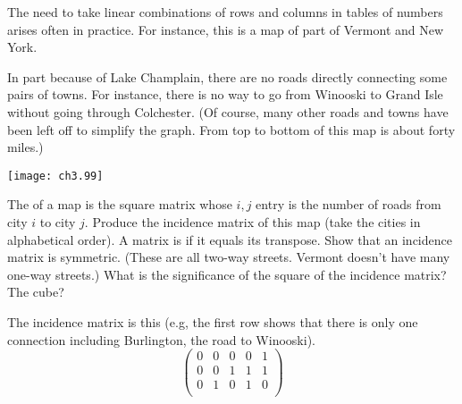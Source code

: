 \begin{exercises}
\begin{answer}
\begin{exparts}
      \end{exparts}   
    \end{answer}
  \recommended \item 
    The need to take linear combinations of rows and columns in tables of 
    numbers arises often in practice.
    For instance, this is a map of part of Vermont and New York.
    \begin{center}
      \parbox{2in}{In part because of Lake Champlain, there are
                      no roads directly connecting some pairs of towns.
                      For instance, there is no way to go from
                      Winooski to Grand Isle without going through
                      Colchester.
                      (Of course, many other roads and towns
                      have been left off to simplify the graph.
                      From top to bottom of this map is
                      about forty miles.)}
      \quad
      \parbox{2in}{\texttt{[image: ch3.99]}}
    \end{center}
    \begin{exparts}
      \partsitem The %
        of a map is the square matrix
        whose \( i,j \) entry is the number of roads from city \( i \)
        to city \( j \).
        Produce the incidence matrix of this map (take the cities in
        alphabetical order).
      \partsitem A matrix is 
        if it equals its transpose.
        Show that an incidence matrix is symmetric.
        (These are all two-way streets.
        Vermont doesn't have many one-way streets.)
      \partsitem What is the significance of the square of the 
        incidence matrix?
        The cube?
    \end{exparts}
    \begin{answer}
      \begin{exparts}
        \partsitem The incidence matrix is this
          (e.g, the first row shows that there is only one connection
          including Burlington, the road to Winooski).
          \begin{equation*}
            \begin{pmatrix}
              0  &0  &0  &0  &1  \\
              0  &0  &1  &1  &1  \\
              0  &1  &0  &1  &0  \\

\end{pmatrix}
\end{equation*}
\end{exparts}
\end{answer}
\end{exercises}
